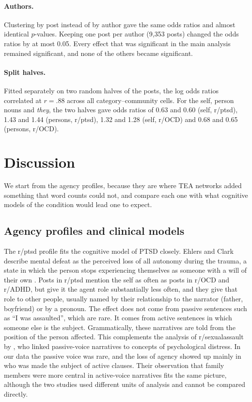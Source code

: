 \documentclass[11pt,a4paper]{article}
\begin{document}
\paragraph{Authors.} Clustering by post instead of by author gave the same odds ratios and almost identical $p$-values. Keeping one post per author (9,353 posts) changed the odds ratios by at most 0.05. Every effect that was significant in the main analysis remained significant, and none of the others became significant.

\paragraph{Split halves.} Fitted separately on two random halves of the posts, the log odds ratios correlated at $r = .88$ across all category--community cells. For the self, person nouns and \textit{they}, the two halves gave odds ratios of 0.63 and 0.60 (self, r/ptsd), 1.43 and 1.44 (persons, r/ptsd), 1.32 and 1.28 (self, r/OCD) and 0.68 and 0.65 (persons, r/OCD).

\section{Discussion}

We start from the agency profiles, because they are where TEA networks added something that word counts could not, and compare each one with what cognitive models of the condition would lead one to expect.

\subsection{Agency profiles and clinical models}

The r/ptsd profile fits the cognitive model of PTSD closely. Ehlers and Clark describe mental defeat as the perceived loss of all autonomy during the trauma, a state in which the person stops experiencing themselves as someone with a will of their own \citep{ehlers2000}. Posts in r/ptsd mention the self as often as posts in r/OCD and r/ADHD, but give it the agent role substantially less often, and they give that role to other people, usually named by their relationship to the narrator (father, boyfriend) or by a pronoun. The effect does not come from passive sentences such as ``I was assaulted'', which are rare. It comes from active sentences in which someone else is the subject. Grammatically, these narratives are told from the position of the person affected. This complements the analysis of r/sexualassault by \citet{abramski2024}, who linked passive-voice narratives to concepts of psychological distress. In our data the passive voice was rare, and the loss of agency showed up mainly in who was made the subject of active clauses. Their observation that family members were more central in active-voice narratives fits the same picture, although the two studies used different units of analysis and cannot be compared directly.
\end{document}
